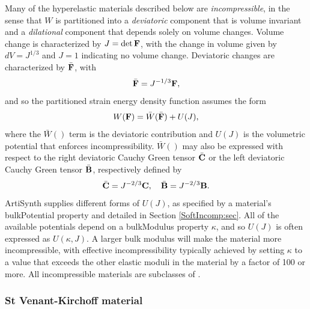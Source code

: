 Many of the hyperelastic materials described below are {\it
incompressible}, in the sense that $W$ is partitioned into a {\it
deviatoric} component that is volume invariant and a {\it dilational}
component that depends solely on volume changes. 
Volume change is
characterized by $J = \det {\bf F}$, with the change in volume given by $d
V = J^{1/3}$ and $J = 1$ indicating no volume change. Deviatoric
changes are characterized by $\bar{{\bf F}}$, with
%
\begin{equation}
\bar{{\bf F}} = J^{-1/3} {\bf F},
\end{equation}
%
and so the partitioned strain energy density function assumes the
form
%
\begin{equation}
W({\bf F}) = \bar W (\bar{{\bf F}}) + U(J),
\end{equation}
%
where the $\bar W()$ term is the deviatoric contribution and
$U(J)$ is the volumetric potential that enforces incompressibility.
$\bar W()$ may also be expressed with respect to the right deviatoric
Cauchy Green tensor $\bar{{\bf C}}$ or the left deviatoric Cauchy Green
tensor $\bar{{\bf B}}$, respectively defined by
%
\begin{equation}
\bar{{\bf C}} = J^{-2/3} {\bf C}, \quad 
\bar{{\bf B}} = J^{-2/3} {\bf B}.
\end{equation}
%
ArtiSynth supplies different forms of $U(J)$, as specified by a
material's {\sf bulkPotential} property and detailed in
Section \ref{SoftIncomp:sec}. All of the available potentials depend
on a {\sf bulkModulus} property $\kappa$, and so $U(J)$ is often
expressed as $U(\kappa,J)$. A larger bulk modulus will make the
material more incompressible, with effective incompressibility
typically achieved by setting $\kappa$ to a value that exceeds the
other elastic moduli in the material by a factor of 100 or more.
All incompressible materials are subclasses of
.

\subsubsection{St Venant-Kirchoff material}

